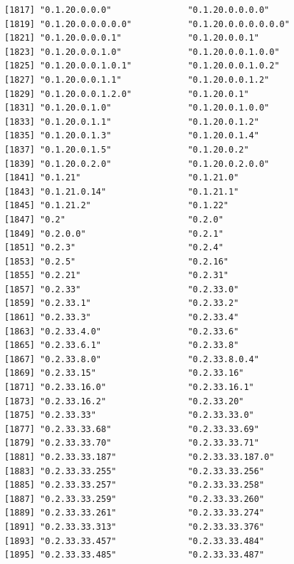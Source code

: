 \documentclass[
  letterpaper,
  DIV=11,
  numbers=noendperiod]{scrreprt}
\begin{document}
\begin{verbatim}
[1817] "0.1.20.0.0.0"               "0.1.20.0.0.0.0"            
[1819] "0.1.20.0.0.0.0.0"           "0.1.20.0.0.0.0.0.0"        
[1821] "0.1.20.0.0.0.1"             "0.1.20.0.0.1"              
[1823] "0.1.20.0.0.1.0"             "0.1.20.0.0.1.0.0"          
[1825] "0.1.20.0.0.1.0.1"           "0.1.20.0.0.1.0.2"          
[1827] "0.1.20.0.0.1.1"             "0.1.20.0.0.1.2"            
[1829] "0.1.20.0.0.1.2.0"           "0.1.20.0.1"                
[1831] "0.1.20.0.1.0"               "0.1.20.0.1.0.0"            
[1833] "0.1.20.0.1.1"               "0.1.20.0.1.2"              
[1835] "0.1.20.0.1.3"               "0.1.20.0.1.4"              
[1837] "0.1.20.0.1.5"               "0.1.20.0.2"                
[1839] "0.1.20.0.2.0"               "0.1.20.0.2.0.0"            
[1841] "0.1.21"                     "0.1.21.0"                  
[1843] "0.1.21.0.14"                "0.1.21.1"                  
[1845] "0.1.21.2"                   "0.1.22"                    
[1847] "0.2"                        "0.2.0"                     
[1849] "0.2.0.0"                    "0.2.1"                     
[1851] "0.2.3"                      "0.2.4"                     
[1853] "0.2.5"                      "0.2.16"                    
[1855] "0.2.21"                     "0.2.31"                    
[1857] "0.2.33"                     "0.2.33.0"                  
[1859] "0.2.33.1"                   "0.2.33.2"                  
[1861] "0.2.33.3"                   "0.2.33.4"                  
[1863] "0.2.33.4.0"                 "0.2.33.6"                  
[1865] "0.2.33.6.1"                 "0.2.33.8"                  
[1867] "0.2.33.8.0"                 "0.2.33.8.0.4"              
[1869] "0.2.33.15"                  "0.2.33.16"                 
[1871] "0.2.33.16.0"                "0.2.33.16.1"               
[1873] "0.2.33.16.2"                "0.2.33.20"                 
[1875] "0.2.33.33"                  "0.2.33.33.0"               
[1877] "0.2.33.33.68"               "0.2.33.33.69"              
[1879] "0.2.33.33.70"               "0.2.33.33.71"              
[1881] "0.2.33.33.187"              "0.2.33.33.187.0"           
[1883] "0.2.33.33.255"              "0.2.33.33.256"             
[1885] "0.2.33.33.257"              "0.2.33.33.258"             
[1887] "0.2.33.33.259"              "0.2.33.33.260"             
[1889] "0.2.33.33.261"              "0.2.33.33.274"             
[1891] "0.2.33.33.313"              "0.2.33.33.376"             
[1893] "0.2.33.33.457"              "0.2.33.33.484"             
[1895] "0.2.33.33.485"              "0.2.33.33.487"             

\end{verbatim}
\end{document}

